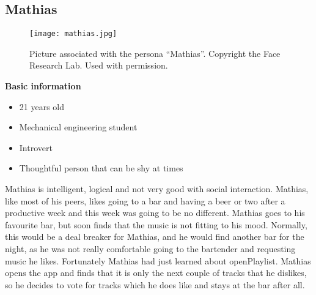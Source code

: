 \subsection{Mathias}
\begin{figure}[hbtp]
  \centering
  \texttt{[image: mathias.jpg]}
  \caption[Persona \enquote{Mathias}.]{Picture associated with the persona \enquote{Mathias}. Copyright the Face Research Lab. Used with permission.}\label{fig:mathias}
\end{figure}
\noindent\textbf{Basic information}

\begin{itemize}
\item 21 years old
\item Mechanical engineering student
\item Introvert
\item Thoughtful person that can be shy at times
\end{itemize}

Mathias is intelligent, logical and not very good with social interaction. Mathias, like most of his peers, likes going to a bar and having a beer or two after a productive week and this week was going to be no different. Mathias goes to his favourite bar, but soon finds that the music is not fitting to his mood. Normally, this would be a deal breaker for Mathias, and he would find another bar for the night, as he was not really comfortable going to the bartender and requesting music he likes. Fortunately Mathias had just learned about openPlaylist. Mathias opens the app and finds that it is only the next couple of tracks that he dislikes, so he decides to vote for tracks which he does like and stays at the bar after all.
